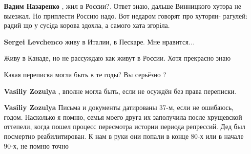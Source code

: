 \begin{itemize}
\begin{itemize}
\textbf{Вадим Назаренко} , жил в России?. Ответ знаю, дальше Винницкого хутора
не выезжал. Но приплести Россию надо. Вот недаром говорят про хуторян- рагулей:
радий що у сусiда корова здохла, а самого хата згорiла.

 
\textbf{Sergei Levchenco} живу в Италии, в Пескаре. Мне нравится...

 
Живу в Канаде, но не рассуждаю как живут в России. Хотя прекрасно знаю
\end{itemize}

 
Какая переписка могла быть в те годы? Вы серьёзно ?

\begin{itemize}
 
\textbf{Vasiliy Zozulya} , вполне могла быть, если не осуждён без права переписки.


 
\textbf{Vasiliy Zozulya} Письма и документы датированы 37-м, если не ошибаюсь,
годом. Насколько я помню, семья моего друга их заполучила после хрущевской
оттепели, когда пошел процесс пересмотра истории периода репрессий. Дед был
посмертно реабилитирован. К нам в руки они попали в конце 80-х или в начале
90-х, не помню точно


\end{itemize}
\end{itemize}
